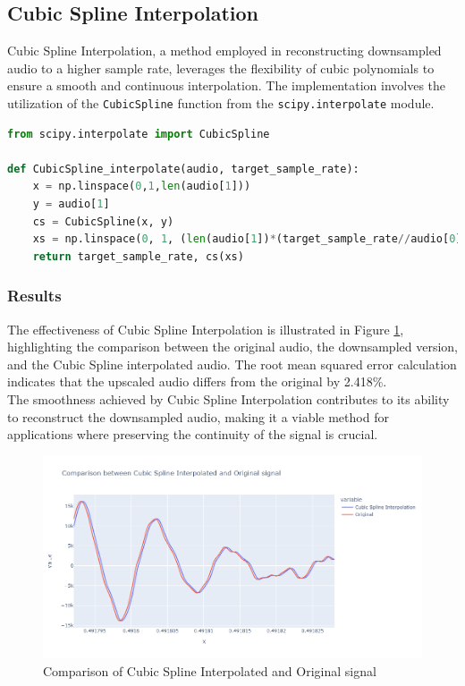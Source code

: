 \documentclass{article}
\begin{document}
\newpage
\subsection{Cubic Spline Interpolation}

Cubic Spline Interpolation, a method employed in reconstructing downsampled audio to a higher sample rate, leverages the flexibility of cubic polynomials to ensure a smooth and continuous interpolation. The implementation involves the utilization of the \texttt{CubicSpline} function from the \texttt{scipy.interpolate} module.


\begin{lstlisting}[language=Python, caption={Cubic Spline Interpolation}]
from scipy.interpolate import CubicSpline

def CubicSpline_interpolate(audio, target_sample_rate):
    x = np.linspace(0,1,len(audio[1]))
    y = audio[1]
    cs = CubicSpline(x, y)
    xs = np.linspace(0, 1, (len(audio[1])*(target_sample_rate//audio[0])))
    return target_sample_rate, cs(xs)
\end{lstlisting} 

\subsubsection{Results}

The effectiveness of Cubic Spline Interpolation is illustrated in Figure \ref{fig:cubic_spline}, highlighting the comparison between the original audio, the downsampled version, and the Cubic Spline interpolated audio. The root mean squared error calculation indicates that the upscaled audio differs from the original by 2.418\%.\cite{wiki_rmsd} \\

The smoothness achieved by Cubic Spline Interpolation contributes to its ability to reconstruct the downsampled audio, making it a viable method for applications where preserving the continuity of the signal is crucial.

\begin{figure}[h]
    \centering
    \includegraphics[width=\textwidth]{cubic_spline.png}
    \caption{Comparison of Cubic Spline Interpolated and Original signal}
    \label{fig:cubic_spline}
\end{figure}
\end{document}
